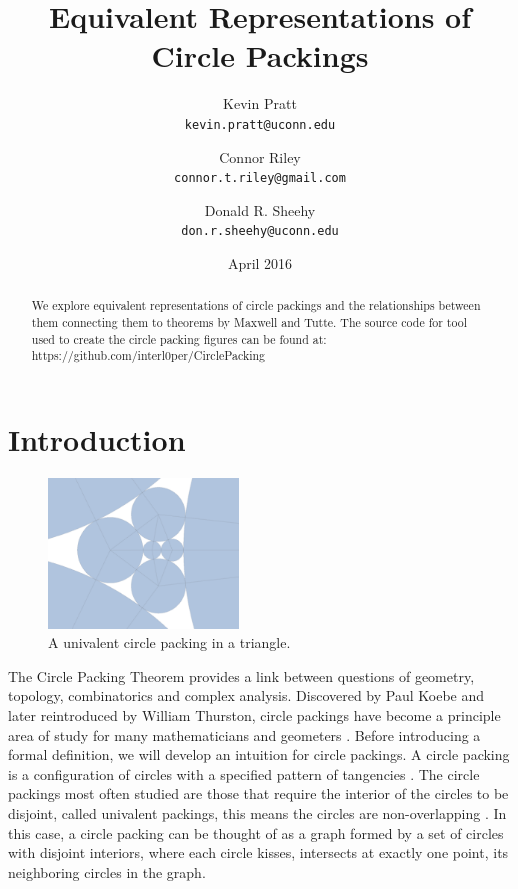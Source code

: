 \documentclass[11pt]{article}
\title{Equivalent Representations of Circle Packings}
\author{
  Kevin Pratt\\
  \texttt{kevin.pratt@uconn.edu}
  \and
  Connor Riley\\
  \texttt{connor.t.riley@gmail.com}
    \and
  Donald R. Sheehy\\
  \texttt{don.r.sheehy@uconn.edu}
}\date{April 2016}
\theoremstyle{definition}
\begin{document}
\maketitle

\begin{abstract}
  We explore equivalent representations of circle packings and the relationships between them connecting them to theorems by Maxwell and Tutte.  
  The source code for tool used to create the circle packing figures can be found at: \\ https://github.com/interl0per/CirclePacking
\end{abstract}

\section{Introduction}

\begin{figure}
  \begin{center}
    \includegraphics[scale=.18,width=0.45\textwidth]{circlepacking_1}
  \end{center}
  \caption{A univalent circle packing in a triangle.}
\end{figure}

	The Circle Packing Theorem provides a link between questions of geometry, topology, combinatorics and complex analysis. 
	Discovered by Paul Koebe and later reintroduced by William Thurston, circle packings have become a principle area of study for many mathematicians and geometers \cite{wilkerson}. 
	Before introducing a formal definition, we will develop an intuition for circle packings. 
	A circle packing is a configuration of circles with a specified pattern of tangencies \cite{stephenson05introduction}. 
	The circle packings most often studied are those that require the interior of the circles to be disjoint, called univalent packings, this means the circles are non-overlapping \cite{stephenson05introduction}. 
	In this case, a circle packing can be thought of as a graph formed by a set of circles with disjoint interiors, where each circle kisses, intersects at exactly one point, its neighboring circles in the graph.
\end{document}
